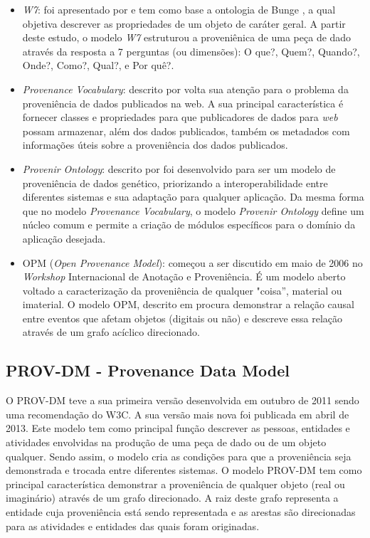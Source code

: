 \begin{itemize}
\item \textit{W7}: foi apresentado por \cite{ram} e tem como base a ontologia de Bunge \cite{bunge}, a qual objetiva descrever as propriedades de um objeto de caráter geral. A partir deste estudo, o modelo \textit{W7} estruturou a proveniênica de uma peça de dado através da resposta a 7 perguntas (ou dimensões): O que?, Quem?, Quando?, Onde?, Como?, Qual?, e Por quê?.
\item \textit{Provenance Vocabulary}: descrito por \cite{zhao} volta sua atenção para o problema da proveniência de dados publicados na web. A sua principal característica é fornecer classes e propriedades para que publicadores de dados para \textit{web} possam armazenar, além dos dados publicados, também os metadados com informações úteis sobre a proveniência dos dados publicados.
\item \textit{Provenir Ontology}: descrito por \cite{sahoo} foi desenvolvido para ser um modelo de proveniência de dados genético, priorizando a interoperabilidade entre diferentes sistemas e sua adaptação para qualquer aplicação. Da mesma forma que no modelo \textit{Provenance Vocabulary}, o modelo \textit{Provenir Ontology} define um núcleo comum e permite a criação de módulos específicos para o domínio da aplicação desejada.
\item OPM (\textit{Open Provenance Model}): começou a ser discutido em maio de 2006 no \textit{Workshop} Internacional de Anotação e Proveniência. É um modelo aberto voltado a caracterização da proveniência de qualquer "coisa'', material ou imaterial. O modelo OPM, descrito em \cite{moreau} procura demonstrar a relação causal entre eventos que afetam objetos (digitais ou não) e descreve essa relação através de um grafo acíclico direcionado.
\end{itemize}

\subsection{PROV-DM - Provenance Data Model}

O PROV-DM teve a sua primeira versão desenvolvida em outubro de 2011 sendo uma recomendação do W3C. A sua versão mais nova foi publicada em abril de 2013. Este modelo tem como principal função descrever as pessoas, entidades e atividades envolvidas na produção de uma peça de dado ou de um objeto qualquer. Sendo assim, o modelo cria as condições para que a proveniência seja demonstrada e trocada entre diferentes sistemas.
O modelo PROV-DM tem como principal característica demonstrar a proveniência de qualquer objeto (real ou imaginário) através de um grafo direcionado. A raiz deste grafo representa a entidade cuja proveniência está sendo representada e as arestas são direcionadas para as atividades e entidades das quais foram originadas.

